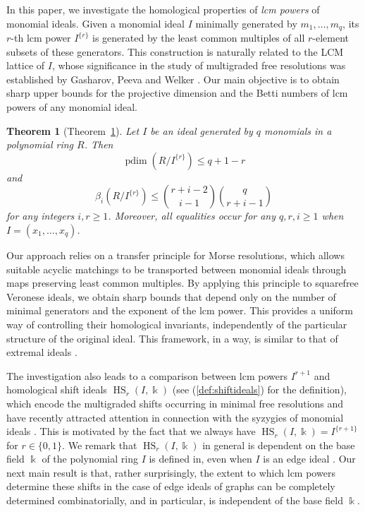 \documentclass[reqno]{amsart}
\DeclareMathOperator{\pdim}{pdim}
\DeclareMathOperator{\HS}{HS}
\newtheorem{theorem}{Theorem}[section]
\theoremstyle{definition}
\theoremstyle{remark}
\numberwithin{equation}{section}
\begin{document}
In this paper, we investigate the homological properties of \textit{lcm powers} of monomial ideals. Given a monomial ideal \(I\) minimally generated by \(m_1,\ldots,m_q\), its \(r\)-th lcm power \(I^{\{r\}}\) is generated by the least common multiples of all \(r\)-element subsets of these generators. This construction is naturally related to the LCM lattice of \(I\), whose significance in the study of multigraded free resolutions was established by Gasharov, Peeva and Welker \cite{GPW99}. Our main objective is to obtain sharp upper bounds for the projective dimension and the Betti numbers of lcm powers of any monomial ideal.

\begin{theorem}[Theorem~\ref{thm:extremal-Betti}]\label{thm:extremal-Betti}
    Let $I$ be an ideal generated by $q$ monomials in a polynomial ring $R$. Then
    \[
    \pdim(R/I^{\{r\}})\leq q+1-r
    \]
    and
    \[
    \beta_i(R/I^{\{r\}})\leq \binom{r+i-2}{i-1} \binom{q}{r+i-1}
    \]
    for any integers $i,r\geq 1$. Moreover, all equalities occur for any $q,r, i\geq 1$ when $I=(x_1,\dots, x_q)$.
\end{theorem}

Our approach relies on a transfer principle for Morse resolutions, which allows suitable acyclic matchings to be transported between monomial ideals through maps preserving least common multiples. By applying this principle to squarefree Veronese ideals, we obtain sharp bounds that depend only on the number of minimal generators and the exponent of the lcm power. This provides a uniform way of controlling their homological invariants, independently of the particular structure of the original ideal. This framework, in a way, is similar to that of extremal ideals \cite{3rd,chau2026symbolicpowersintegralclosures,Lr,extremal}.

The investigation also leads to a comparison between lcm powers $I^{r+1}$ and homological shift ideals $\HS_r(I,\Bbbk)$ (see (\ref{def:shiftideals}) for the definition), which encode the multigraded shifts occurring in minimal free resolutions and have recently attracted attention in connection with the syzygies of monomial ideals \cite{Bayati2018,Bayati2023,BayatiJahaniTaghipour2019,ChauDasMaithani2026,Ficarra2025,FicarraHerzog2023,HS1,HMRZ2021}. This is motivated by the fact that we always have $\HS_r(I,\Bbbk)=I^{\{r+1\}}$ for $r\in \{0,1\}$. We remark that $\HS_r(I,\Bbbk)$ in general is dependent on the base field $\Bbbk$ of the polynomial ring $I$ is defined in, even when $I$ is an edge ideal \cite{Katzman2006}. Our next main result is that, rather surprisingly, the extent to which lcm powers determine these shifts in the case of edge ideals of graphs can be completely determined combinatorially, and in particular, is independent of the base field $\Bbbk$. 
\end{document}
